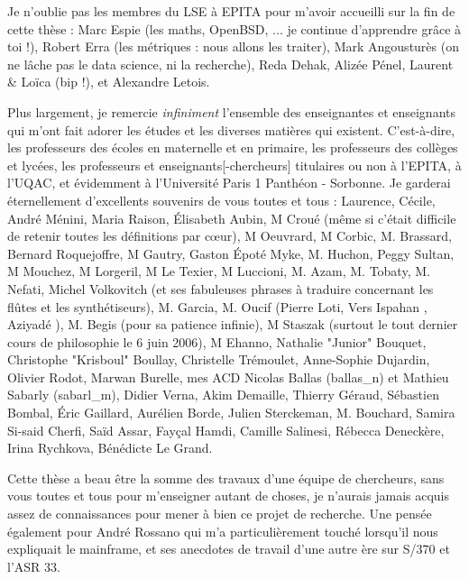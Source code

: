 \begin{small}
\smallskip

Je n'oublie pas les membres du LSE à EPITA pour m'avoir accueilli sur la fin de cette thèse : Marc Espie (les maths, OpenBSD, ... je continue d'apprendre grâce à toi !), Robert Erra (les métriques : nous allons les traiter), Mark Angousturès (on ne lâche pas le data science, ni la recherche), Reda Dehak, Alizée Pénel, Laurent \& Loïca (bip !), et Alexandre Letois.

\smallskip

Plus largement, je remercie \textit{infiniment} l'ensemble des enseignantes et enseignants qui m'ont fait adorer les études et les diverses matières qui existent.
C'est-à-dire, les professeurs des écoles en maternelle et en primaire, les professeurs des collèges et lycées, les professeurs et enseignants[-chercheurs] titulaires ou non à l'EPITA, à l'UQAC, et évidemment à l'Université Paris 1 Panthéon - Sorbonne.
Je garderai éternellement d'excellents souvenirs de vous toutes et tous :
Laurence, Cécile,
André Ménini, Maria Raison, \'Elisabeth Aubin,
M Croué (même si c'était difficile de retenir toutes les définitions par c\oe{}ur), M Oeuvrard, M Corbic,
M. Brassard, Bernard Roquejoffre, M Gautry,
Gaston Époté Myke, M. Huchon, Peggy Sultan, M Mouchez, M Lorgeril,
M Le Texier, M Luccioni, M. Azam, M. Tobaty,
M. Nefati,
Michel Volkovitch (et ses fabuleuses phrases à traduire concernant les flûtes et les synthétiseurs), M. Garcia, M. Oucif (Pierre Loti, \og Vers Ispahan \fg, \og Aziyadé \fg), M. Begis (pour sa patience infinie),
M Staszak (surtout le tout dernier cours de philosophie le 6 juin 2006), M Ehanno,
Nathalie "Junior" Bouquet, Christophe "Krisboul" Boullay, Christelle Trémoulet, Anne-Sophie Dujardin, Olivier Rodot, Marwan Burelle, mes ACD Nicolas Ballas (ballas\_n) et Mathieu Sabarly (sabarl\_m),
Didier Verna, Akim Demaille, Thierry Géraud, %
Sébastien Bombal, \'Eric Gaillard, Aurélien Borde, Julien Sterckeman,
M. Bouchard,
Samira Si-said Cherfi, Saïd Assar, Fayçal Hamdi, Camille Salinesi, Rébecca Deneckère, Irina Rychkova, Bénédicte Le Grand.

Cette thèse a beau être la somme des travaux d'une équipe de chercheurs, sans vous toutes et tous pour m'enseigner autant de choses, je n'aurais jamais acquis assez de connaissances pour mener à bien ce projet de recherche.
Une pensée également pour André Rossano qui m'a particulièrement touché lorsqu'il nous expliquait le mainframe, et ses anecdotes de travail d'une autre ère sur S/370 et l'ASR 33.


\end{small}
